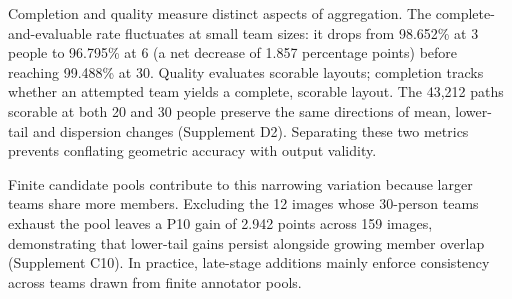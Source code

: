 Completion and quality measure distinct aspects of aggregation. The complete-and-evaluable rate fluctuates at small team sizes: it drops from 98.652\% at 3 people to 96.795\% at 6 (a net decrease of 1.857 percentage points) before reaching 99.488\% at 30. Quality evaluates scorable layouts; completion tracks whether an attempted team yields a complete, scorable layout. The 43,212 paths scorable at both 20 and 30 people preserve the same directions of mean, lower-tail and dispersion changes (Supplement D2). Separating these two metrics prevents conflating geometric accuracy with output validity.

Finite candidate pools contribute to this narrowing variation because larger teams share more members. Excluding the 12 images whose 30-person teams exhaust the pool leaves a P10 gain of 2.942 points across 159 images, demonstrating that lower-tail gains persist alongside growing member overlap (Supplement C10). In practice, late-stage additions mainly enforce consistency across teams drawn from finite annotator pools.
